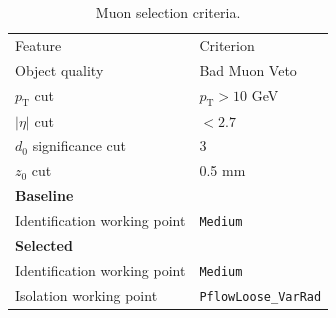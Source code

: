 \begin{table}[ht]
  \caption{Muon selection criteria.}%
  \label{tab:object:muon}
  \centering
  \begin{tabular}[ht]{ll}
    \toprule
    Feature & Criterion \\
    Object quality & Bad Muon Veto \\
    $p_{\mathrm{T}}$ cut & $p_{\mathrm{T}}>10$ GeV \\
    $|\eta|$ cut & $< 2.7$ \\
    $d_{0}$ significance cut & 3 \\
    $z_{0}$ cut & 0.5 mm \\
    \midrule
    \midrule
    \textbf{Baseline} &\\
    \midrule
    Identification working point & \texttt{Medium} \\
    \midrule
    \textbf{Selected} &\\
    \midrule
    Identification working point & \texttt{Medium} \\
    Isolation working point & \texttt{PflowLoose\_VarRad}\\
    \bottomrule
  \end{tabular} 
\end{table}


